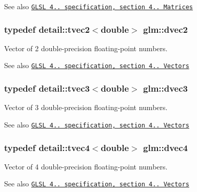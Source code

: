 \begin{DoxySeeAlso}{See also}
\href{http://www.opengl.org/registry/doc/GLSLangSpec.4.20.8.pdf}{\tt G\+L\+S\+L 4.. specification, section 4.. Matrices} 
\end{DoxySeeAlso}
\hypertarget{group__core__types_gad9953f484cbb104e8675653ce61900cb}{}
\subsubsection[{dvec2}]{\setlength{\rightskip}{0pt plus 5cm}typedef detail\+::tvec2$<$double$>$ {\bf glm\+::dvec2}}\label{group__core__types_gad9953f484cbb104e8675653ce61900cb}
Vector of 2 double-\/precision floating-\/point numbers.

\begin{DoxySeeAlso}{See also}
\href{http://www.opengl.org/registry/doc/GLSLangSpec.4.20.8.pdf}{\tt G\+L\+S\+L 4.. specification, section 4.. Vectors} 
\end{DoxySeeAlso}
\hypertarget{group__core__types_ga140a8656fbb8b19382f109c5d5869856}{}
\subsubsection[{dvec3}]{\setlength{\rightskip}{0pt plus 5cm}typedef detail\+::tvec3$<$double$>$ {\bf glm\+::dvec3}}\label{group__core__types_ga140a8656fbb8b19382f109c5d5869856}
Vector of 3 double-\/precision floating-\/point numbers.

\begin{DoxySeeAlso}{See also}
\href{http://www.opengl.org/registry/doc/GLSLangSpec.4.20.8.pdf}{\tt G\+L\+S\+L 4.. specification, section 4.. Vectors} 
\end{DoxySeeAlso}
\hypertarget{group__core__types_ga0127b78c4c51b270b2a2ef848c01b5d9}{}
\subsubsection[{dvec4}]{\setlength{\rightskip}{0pt plus 5cm}typedef detail\+::tvec4$<$double$>$ {\bf glm\+::dvec4}}\label{group__core__types_ga0127b78c4c51b270b2a2ef848c01b5d9}
Vector of 4 double-\/precision floating-\/point numbers.

\begin{DoxySeeAlso}{See also}
\href{http://www.opengl.org/registry/doc/GLSLangSpec.4.20.8.pdf}{\tt G\+L\+S\+L 4.. specification, section 4.. Vectors} 
\end{DoxySeeAlso}
\hypertarget{group__core__types_ga606b9d298d8aaa55c449182c340b4622}{}
